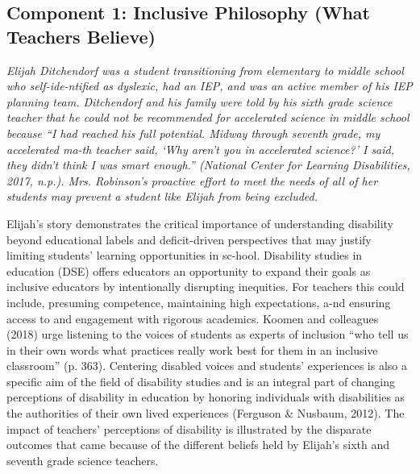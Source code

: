 \documentclass[11.5pt]{sig-alternate}
\begin{document}
\begin{large}
\subsection*{Component 1: Inclusive Philosophy (What Teachers Believe)}

\textit{Elijah Ditchendorf was a student transitioning from elementary to middle school who self-ide-ntified as dyslexic, had an IEP, and was an active member of his IEP planning team. Ditchendorf and his family were told by his sixth grade science teacher that he could not be recommended for accelerated science in middle school because “I had reached his full potential. Midway through seventh grade, my accelerated ma-th teacher said, ‘Why aren’t you in accelerated science?’ I said, they didn’t think I was smart enough.” (National Center for Learning Disabilities, 2017, n.p.). Mrs. Robinson’s proactive effort to meet the needs of all of her students may prevent a student like Elijah from being excluded.}

Elijah's story demonstrates the critical importance of understanding disability beyond educational labels and deficit-driven perspectives that may justify limiting students' learning opportunities in sc-hool. Disability studies in education (DSE) offers educators an opportunity to expand their goals as inclusive educators by intentionally disrupting inequities. For teachers this could include, presuming competence, maintaining high expectations, a-nd ensuring access to and engagement with rigorous academics. Koomen and colleagues (2018) urge listening to the voices of students as experts of inclusion “who tell us in their own words what practices really work best for them in an inclusive classroom” (p. 363). Centering disabled voices and students' experiences is also a specific aim of the field of disability studies and is an integral part of changing perceptions of disability in education by honoring individuals with disabilities as the authorities of their own lived experiences (Ferguson \& Nusbaum, 2012). The impact of teachers' perceptions of disability is illustrated by the disparate outcomes that came because of the different beliefs held by Elijah’s sixth and seventh grade science teachers.
	

\end{large}
\end{document}
